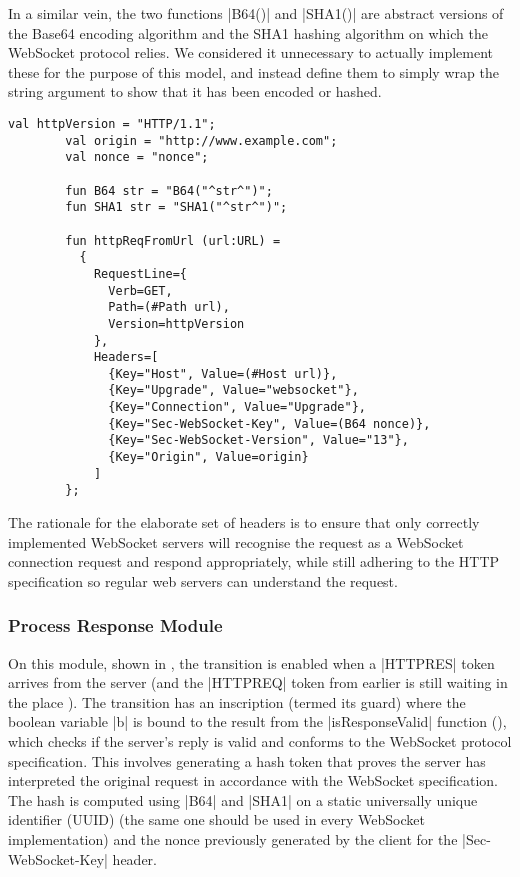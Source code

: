		In a similar vein, the two functions |B64()| and |SHA1()| are
		abstract versions of the Base64 encoding algorithm \cite{rfc4648} and the SHA1
		hashing algorithm \cite{fips.180-2} on which the WebSocket protocol relies. We
		considered it unnecessary to actually implement these for the purpose of
		this model, and instead define them to simply wrap the string argument to show
		that it has been encoded or hashed.
		
		\begin{lstlisting}[label=lst:httpReqFromUrl,caption=httpReqFromUrl,gobble=2,float]
		val httpVersion = "HTTP/1.1";
		val origin = "http://www.example.com";
		val nonce = "nonce";
		
		fun B64 str = "B64("^str^")";
		fun SHA1 str = "SHA1("^str^")";
		
		fun httpReqFromUrl (url:URL) = 
          {
            RequestLine={
              Verb=GET, 
              Path=(#Path url),
              Version=httpVersion
            },
            Headers=[
              {Key="Host", Value=(#Host url)},
              {Key="Upgrade", Value="websocket"},
              {Key="Connection", Value="Upgrade"},
              {Key="Sec-WebSocket-Key", Value=(B64 nonce)},
              {Key="Sec-WebSocket-Version", Value="13"},
              {Key="Origin", Value=origin}
            ]
		};
		\end{lstlisting}
		
		The rationale for the elaborate set of headers is to ensure that only
		correctly implemented WebSocket servers will recognise the request as a
		WebSocket connection request and respond appropriately, while still adhering
		to the HTTP specification so regular web servers can understand the request.
		
		
	\subsubsection{Process Response Module}
		
		
		On this module, shown in , the transition
		 is enabled when a |HTTPRES| token arrives
		from the server (and the |HTTPREQ| token from earlier is still waiting in the
		place ). The transition has an
		inscription (termed its guard) where the boolean variable |b| is bound to the
		result from the |isResponseValid| function (), which checks if the
		server's reply is valid and conforms to the WebSocket protocol specification.
		This involves generating a hash token that proves the server has interpreted
		the original request in accordance with the WebSocket specification. The hash
		is computed using |B64| and |SHA1| on a static universally unique identifier
		(UUID) (the same one should be used in every WebSocket implementation) and the
		nonce previously generated by the client for the |Sec-WebSocket-Key| header.
		
